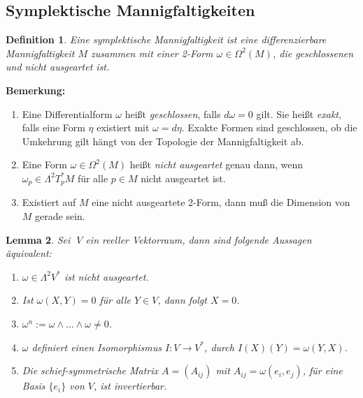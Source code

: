 \documentclass[12pt,a4paper]{article}
\newtheorem{Lemma}{Lemma}[section]
\newtheorem{Definition}[Lemma]{Definition}
\begin{document}
\bigskip





\subsection{Symplektische Mannigfaltigkeiten}

\bigskip

\begin{Definition}
Eine {\em symplektische Mannigfaltigkeit} ist eine differenzierbare Mannigfaltigkeit $M$
zusammen mit einer 2-Form $\omega \in \Omega^2(M)$, die geschlossenen
und nicht ausgeartet ist.
\end{Definition}

\medskip

{\bf Bemerkung:}
\begin{enumerate}
\item
Eine Differentialform $\omega$ hei\ss t {\it geschlossen}, falls $d\omega = 0$ gilt.
Sie hei\ss t {\it exakt}, falls eine Form $\eta $ existiert mit $\omega = d\eta$. Exakte
Formen sind geschlossen, ob die Umkehrung gilt h\"angt von der Topologie der Mannigfaltigkeit ab.
\item
Eine Form $\omega \in \Omega^2(M)$ hei\ss t {\it nicht ausgeartet} genau dann, wenn $\omega_p \in
\Lambda^2T_p^*M$ f\"ur alle $p \in M$ nicht ausgeartet ist.
\item
Existiert auf $M$ eine nicht ausgeartete 2-Form, dann mu\ss{} die Dimension von $M$
gerade sein.
\end{enumerate}

\bigskip

\begin{Lemma}
Sei $\; V$ ein reeller Vektorraum, dann sind folgende Aussagen \"aquivalent:
\begin{enumerate}
\item
$\omega \in \Lambda^2 V^*$ ist nicht ausgeartet.
\item
Ist $\omega (X,Y)=0$ f\"ur alle $Y\in V$, dann folgt $X=0$.
\item
$\omega^n := \omega \wedge \ldots \wedge \omega \neq 0$.
\item
$\omega$ definiert einen Isomorphismus $I: V \rightarrow V^*$, durch
$I(X)(Y) = \omega(Y,X)$.
\item
Die schief-symmetrische Matrix $A = (A_{ij})$ mit $ A_{ij} = \omega(e_i,e_j)$,
f\"ur eine Basis $\{e_i \}$ von $V$, ist invertierbar.
\end{enumerate}
\end{Lemma}
\end{document}
